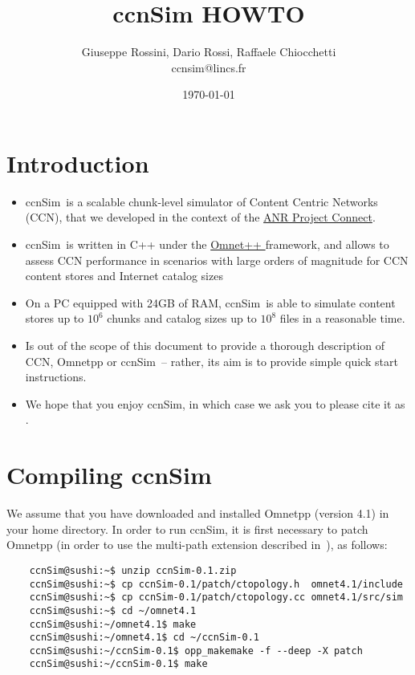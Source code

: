 \documentclass[10pt]{article}
\author{Giuseppe Rossini, Dario Rossi, Raffaele Chiocchetti\\ ccnsim@lincs.fr}
\date{\today}
\title{ccnSim HOWTO}
\newcommand{\ccnSim}[0]{ccnSim}
\begin{document}
\maketitle

\section{Introduction}

\begin{itemize}
\item \ccnSim\ is a scalable chunk-level simulator of Content Centric Networks (CCN)\cite{ccn}, that we developed in the context of the \href{http://www.anr-connect.org/}{ANR Project Connect}. 

\item \ccnSim\ is written in C++ under the \href{http://www.omnetpp.org/}{Omnet++ } framework, and allows to assess CCN performance in scenarios with large orders of magnitude for CCN content stores and Internet catalog sizes 

\item On a PC equipped with 24GB of RAM, \ccnSim\ is able to simulate content stores up to $10^6$ chunks and catalog sizes up to $10^8$ files in a reasonable time.

\item Is out of the scope of this document to provide a thorough description of CCN, Omnetpp or \ccnSim\ -- rather, its aim is to provide simple quick start instructions.

\item We hope that you enjoy \ccnSim, in which case we ask you to please cite it as \cite{tr1}.
\end{itemize}


\section{Compiling ccnSim}

 We assume that you have downloaded and installed Omnetpp (version 4.1) in your home directory. In order to run \ccnSim, it is first necessary to patch Omnetpp (in order to use the multi-path extension described in~\cite{tr1}), as follows:
 
\begin{verbatim}
    ccnSim@sushi:~$ unzip ccnSim-0.1.zip
    ccnSim@sushi:~$ cp ccnSim-0.1/patch/ctopology.h  omnet4.1/include
    ccnSim@sushi:~$ cp ccnSim-0.1/patch/ctopology.cc omnet4.1/src/sim
    ccnSim@sushi:~$ cd ~/omnet4.1
    ccnSim@sushi:~/omnet4.1$ make
    ccnSim@sushi:~/omnet4.1$ cd ~/ccnSim-0.1
    ccnSim@sushi:~/ccnSim-0.1$ opp_makemake -f --deep -X patch
    ccnSim@sushi:~/ccnSim-0.1$ make    
\end{verbatim}
\end{document}
